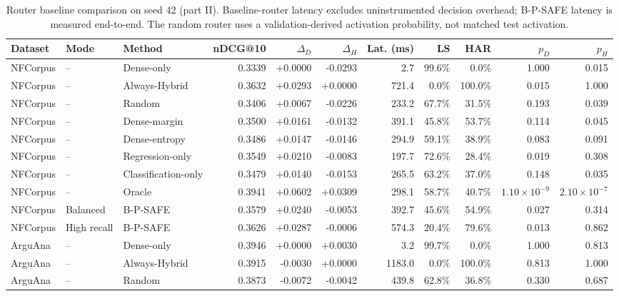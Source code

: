 \begin{table}[!htbp]
\centering
\caption{Router baseline comparison on seed 42 (part II). Baseline-router latency excludes uninstrumented decision overhead; B-P-SAFE latency is measured end-to-end. The random router uses a validation-derived activation probability, not matched test activation.}
\label{tab:router_baselines_b}
\scriptsize
\setlength{\tabcolsep}{2.2pt}
\begin{tabular}{lllrrrrrrrr}
\toprule
Dataset & Mode & Method & nDCG@10 & $\Delta_D$ & $\Delta_H$ & Lat. (ms) & LS & HAR & $p_D$ & $p_H$ \\
\midrule
NFCorpus & -- & Dense-only & 0.3339 & +0.0000 & -0.0293 & 2.7 & 99.6\% & 0.0\% & 1.000 & 0.015 \\
NFCorpus & -- & Always-Hybrid & 0.3632 & +0.0293 & +0.0000 & 721.4 & 0.0\% & 100.0\% & 0.015 & 1.000 \\
NFCorpus & -- & Random & 0.3406 & +0.0067 & -0.0226 & 233.2 & 67.7\% & 31.5\% & 0.193 & 0.039 \\
NFCorpus & -- & Dense-margin & 0.3500 & +0.0161 & -0.0132 & 391.1 & 45.8\% & 53.7\% & 0.114 & 0.045 \\
NFCorpus & -- & Dense-entropy & 0.3486 & +0.0147 & -0.0146 & 294.9 & 59.1\% & 38.9\% & 0.083 & 0.091 \\
NFCorpus & -- & Regression-only & 0.3549 & +0.0210 & -0.0083 & 197.7 & 72.6\% & 28.4\% & 0.019 & 0.308 \\
NFCorpus & -- & Classification-only & 0.3479 & +0.0140 & -0.0153 & 265.5 & 63.2\% & 37.0\% & 0.148 & 0.035 \\
NFCorpus & -- & Oracle & 0.3941 & +0.0602 & +0.0309 & 298.1 & 58.7\% & 40.7\% & $1.10\!\times\!10^{-9}$ & $2.10\!\times\!10^{-7}$ \\
NFCorpus & Balanced & B-P-SAFE & 0.3579 & +0.0240 & -0.0053 & 392.7 & 45.6\% & 54.9\% & 0.027 & 0.314 \\
NFCorpus & High recall & B-P-SAFE & 0.3626 & +0.0287 & -0.0006 & 574.3 & 20.4\% & 79.6\% & 0.013 & 0.862 \\
\midrule
ArguAna & -- & Dense-only & 0.3946 & +0.0000 & +0.0030 & 3.2 & 99.7\% & 0.0\% & 1.000 & 0.813 \\
ArguAna & -- & Always-Hybrid & 0.3915 & -0.0030 & +0.0000 & 1183.0 & 0.0\% & 100.0\% & 0.813 & 1.000 \\
ArguAna & -- & Random & 0.3873 & -0.0072 & -0.0042 & 439.8 & 62.8\% & 36.8\% & 0.330 & 0.687 \\

\end{tabular}
\end{table}
